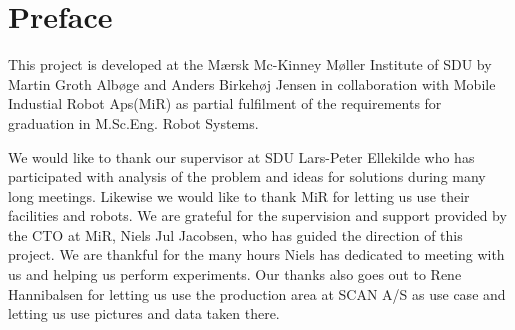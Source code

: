 \chapter*{Preface}
This project is developed at the Mærsk Mc-Kinney Møller Institute of SDU by Martin Groth Albøge and Anders Birkehøj Jensen in collaboration with Mobile Industial Robot Aps(MiR)  as partial fulfilment of the requirements for graduation in M.Sc.Eng. Robot Systems.

We would like to thank our supervisor at SDU Lars-Peter Ellekilde who has participated with analysis of the problem and ideas for solutions during many long meetings.
Likewise we would like to thank MiR for letting us use their facilities and robots.
We are grateful for the supervision and support provided by the CTO at MiR, Niels Jul Jacobsen, who has guided the direction of this project.
We are thankful for the many hours Niels has dedicated to meeting with us and helping us perform experiments.
Our thanks also goes out to Rene Hannibalsen for letting us use the production area at SCAN A/S as use case and letting us use pictures and data taken there.

\vspace{1 cm}

